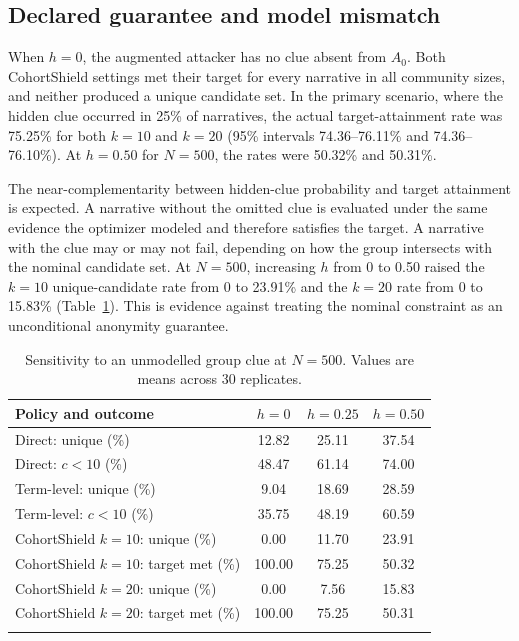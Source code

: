 \documentclass[pdflatex,sn-mathphys-num]{sn-jnl}
\theoremstyle{plain}
\begin{document}
\subsection{Declared guarantee and model mismatch}

When $h=0$, the augmented attacker has no clue absent from $A_0$. Both CohortShield settings met their target for every narrative in all community sizes, and neither produced a unique candidate set. In the primary scenario, where the hidden clue occurred in 25\% of narratives, the actual target-attainment rate was 75.25\% for both $k=10$ and $k=20$ (95\% intervals 74.36--76.11\% and 74.36--76.10\%). At $h=0.50$ for $N=500$, the rates were 50.32\% and 50.31\%.

The near-complementarity between hidden-clue probability and target attainment is expected. A narrative without the omitted clue is evaluated under the same evidence the optimizer modeled and therefore satisfies the target. A narrative with the clue may or may not fail, depending on how the group intersects with the nominal candidate set. At $N=500$, increasing $h$ from 0 to 0.50 raised the $k=10$ unique-candidate rate from 0 to 23.91\% and the $k=20$ rate from 0 to 15.83\% (Table~\ref{tab:mismatch}). This is evidence against treating the nominal constraint as an unconditional anonymity guarantee.

\begin{table}[t]
\caption{Sensitivity to an unmodelled group clue at $N=500$. Values are means across 30 replicates.}\label{tab:mismatch}
\centering
\small
\begin{tabular}{@{}lccc@{}}
\toprule
Policy and outcome & $h=0$ & $h=0.25$ & $h=0.50$\\
\midrule
Direct: unique (\%) & 12.82 & 25.11 & 37.54\\
Direct: $c<10$ (\%) & 48.47 & 61.14 & 74.00\\
Term-level: unique (\%) & 9.04 & 18.69 & 28.59\\
Term-level: $c<10$ (\%) & 35.75 & 48.19 & 60.59\\
CohortShield $k=10$: unique (\%) & 0.00 & 11.70 & 23.91\\
CohortShield $k=10$: target met (\%) & 100.00 & 75.25 & 50.32\\
CohortShield $k=20$: unique (\%) & 0.00 & 7.56 & 15.83\\
CohortShield $k=20$: target met (\%) & 100.00 & 75.25 & 50.31\\
\botrule
\end{tabular}
\end{table}
\end{document}
